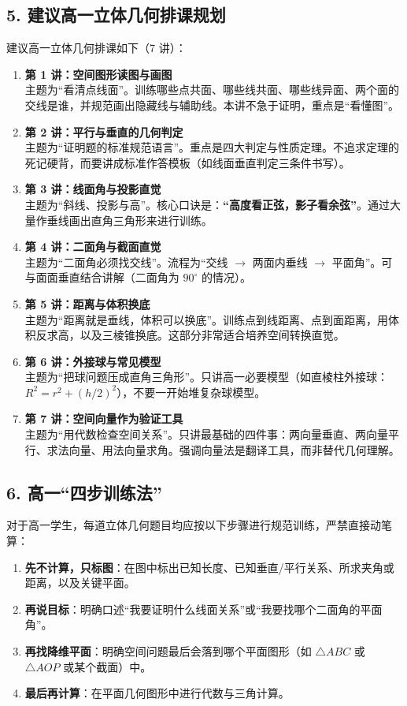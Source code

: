 \documentclass[11pt,a4paper]{ctexart}
\begin{document}
\subsection{5. 建议高一立体几何排课规划}
建议高一立体几何排课如下（7 讲）：
\begin{enumerate}
  \item \textbf{第 1 讲：空间图形读图与画图} \\
    主题为“看清点线面”。训练哪些点共面、哪些线共面、哪些线异面、两个面的交线是谁，并规范画出隐藏线与辅助线。本讲不急于证明，重点是“看懂图”。
  \item \textbf{第 2 讲：平行与垂直的几何判定} \\
    主题为“证明题的标准规范语言”。重点是四大判定与性质定理。不追求定理的死记硬背，而要讲成标准作答模板（如线面垂直判定三条件书写）。
  \item \textbf{第 3 讲：线面角与投影直觉} \\
    主题为“斜线、投影与高”。核心口诀是：\textbf{“高度看正弦，影子看余弦”}。通过大量作垂线画出直角三角形来进行训练。
  \item \textbf{第 4 讲：二面角与截面直觉} \\
    主题为“二面角必须找交线”。流程为“交线 $\rightarrow$ 两面内垂线 $\rightarrow$ 平面角”。可与面面垂直结合讲解（二面角为 $90^\circ$ 的情况）。
  \item \textbf{第 5 讲：距离与体积换底} \\
    主题为“距离就是垂线，体积可以换底”。训练点到线距离、点到面距离，用体积反求高，以及三棱锥换底。这部分非常适合培养空间转换直觉。
  \item \textbf{第 6 讲：外接球与常见模型} \\
    主题为“把球问题压成直角三角形”。只讲高一必要模型（如直棱柱外接球：$R^2 = r^2 + (h/2)^2$），不要一开始堆复杂球模型。
  \item \textbf{第 7 讲：空间向量作为验证工具} \\
    主题为“用代数检查空间关系”。只讲最基础的四件事：两向量垂直、两向量平行、求法向量、用法向量求角。强调向量法是翻译工具，而非替代几何理解。
\end{enumerate}

\subsection{6. 高一“四步训练法”}
对于高一学生，每道立体几何题目均应按以下步骤进行规范训练，严禁直接动笔算：
\begin{enumerate}
  \item \textbf{先不计算，只标图}：在图中标出已知长度、已知垂直/平行关系、所求夹角或距离，以及关键平面。
  \item \textbf{再说目标}：明确口述“我要证明什么线面关系”或“我要找哪个二面角的平面角”。
  \item \textbf{再找降维平面}：明确空间问题最后会落到哪个平面图形（如 $\triangle ABC$ 或 $\triangle AOP$ 或某个截面）中。
  \item \textbf{最后再计算}：在平面几何图形中进行代数与三角计算。
\end{enumerate}
\end{document}
